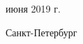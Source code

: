 \documentclass[12pt]{article}
\begin{document}
\begin{titlepage}
\begin{adjustwidth}{0.39in}{0.0in}
\end{adjustwidth}


\vspace{\baselineskip}\begin{adjustwidth}{0.79in}{0.0in}
\begin{FlushRight}
{\fontsize{14pt}{16.8pt} июня 2019 г.\par}
\end{FlushRight}\par

\end{adjustwidth}


\vspace{\baselineskip}
\vspace{\baselineskip}
\vspace{\baselineskip}
\vspace{\baselineskip}
\vspace{\baselineskip}
\vspace{\baselineskip}\begin{Center}
{\fontsize{14pt}{16.8pt}\selectfont Санкт-Петербург\par}
\end{Center}\par

\begin{Center}
{\fontsize{14pt}{16.8pt}\par}
\end{Center}\par

\vspace{\baselineskip}
\end{titlepage}
\end{document}
